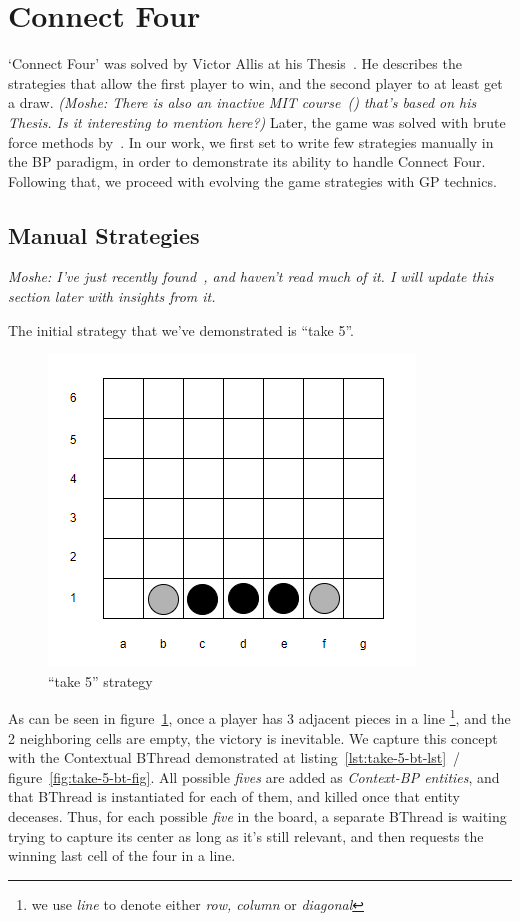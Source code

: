 \documentclass{article}
\begin{document}
\section{Connect Four}
`Connect Four' was solved by Victor Allis at his Thesis~\cite{Allis}.
He describes the strategies that allow the first player to win, and the second player to at least get a draw.
\emph{(Moshe: There is also an inactive MIT course~(\cite{Gymrek2009}) that's based on his Thesis. Is it interesting
to mention here?)}
Later, the game was solved with brute force methods by~\cite{Tromp}.
In our work, we first set to write few strategies manually in the BP paradigm, in order to demonstrate its ability to
handle Connect Four.
Following that, we proceed with evolving the game strategies with GP technics.

\subsection{Manual Strategies}
\emph{Moshe: I've just recently found~\cite{Allis}, and haven't read much of it. I will update this section
later with insights from it.}

The initial strategy that we've demonstrated is ``take 5''.
\begin{figure}[h]
    \includegraphics{five}
    \caption{``take 5'' strategy}
    \label{fig:take-5-strategy}
\end{figure}
As can be seen in figure~\ref{fig:take-5-strategy}, once a player has 3 adjacent pieces in a line \footnote{we use
\emph{line} to denote either \emph{row, column} or \emph{diagonal}}, and the 2 neighboring cells are empty, the
victory is inevitable. We capture this concept with the Contextual BThread demonstrated at
listing~\ref{lst:take-5-bt-lst}~/~
figure~\ref{fig:take-5-bt-fig}. All possible \emph{fives} are added as \emph{Context-BP entities}, and that BThread 
is instantiated for each of them, and killed once that entity deceases. Thus, for each possible \emph{five} in the 
board, a separate BThread is waiting trying to capture its center as long as it's still relevant, and then requests 
the winning last cell of the four in a line.
\end{document}
